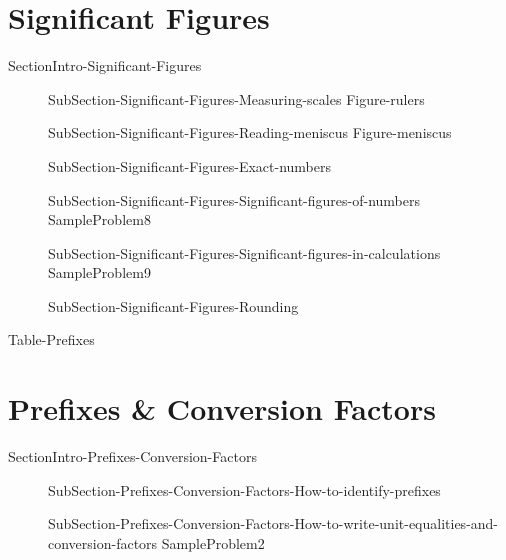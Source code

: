 \documentclass[main.tex]{subfiles}
\newcommand\chapterlabel{Ch-measurements}\setcounter{figurenewcounter}{0}\setcounter{tablenewcounter}{0}\setcounter{formulanewcounter}{0}\chapterpicture{../{\chapterlabel}/figure1}\chapterpicturelabel{PngImg}
\begin{document}
\section{Significant Figures}{SectionIntro-Significant-Figures}
\sloppy\begin{description}
\item[]{SubSection-Significant-Figures-Measuring-scales}
{Figure-rulers}
\item[]{SubSection-Significant-Figures-Reading-meniscus}
{Figure-meniscus}
\item[]{SubSection-Significant-Figures-Exact-numbers}
\item[]{SubSection-Significant-Figures-Significant-figures-of-numbers}
{SampleProblem8}%
\item[]{SubSection-Significant-Figures-Significant-figures-in-calculations}
{SampleProblem9}%
\item[]{SubSection-Significant-Figures-Rounding}
\end{description}

{Table-Prefixes}
\section{Prefixes \& Conversion Factors}{SectionIntro-Prefixes-Conversion-Factors}
\sloppy\begin{description}
\item[]{SubSection-Prefixes-Conversion-Factors-How-to-identify-prefixes}
\item[]{SubSection-Prefixes-Conversion-Factors-How-to-write-unit-equalities-and-conversion-factors}
{SampleProblem2}%
\end{description}
\end{document}
